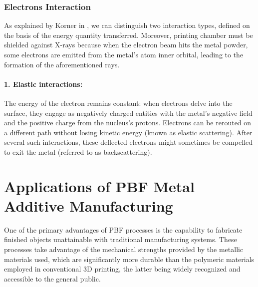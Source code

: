 \subsubsection{Electrons Interaction}
\label{sssec:electroninteractions}
As explained by Korner in \cite{korner_additive_2016}, we can distinguish two interaction types, defined on the basis of the energy quantity transferred.
Moreover, printing chamber must be shielded against X-rays because when the electron beam hits the metal powder, some electrons are emitted from the metal's atom inner orbital, leading to the formation of the aforementioned rays.

\paragraph{1. Elastic interactions:}
The energy of the electron remains constant: when electrons delve into the surface, they engage as negatively charged entities with the metal's negative field and the positive charge from the nucleus's protons. Electrons can be rerouted on a different path without losing kinetic energy (known as elastic scattering). After several such interactions, these deflected electrons might sometimes be compelled to exit the metal (referred to as backscattering).


\section{Applications of PBF Metal Additive Manufacturing}
\label{sec:examplesPBF}
One of the primary advantages of PBF processes is the capability to fabricate finished objects unattainable with traditional manufacturing systems. These processes take advantage of the mechanical strengths provided by the metallic materials used, which are significantly more durable than the polymeric materials employed in conventional 3D printing, the latter being widely recognized and accessible to the general public.  


